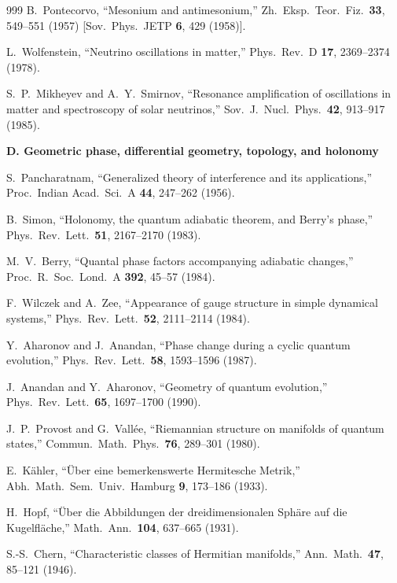 \begin{thebibliography}{999}
B.~Pontecorvo,
``Mesonium and antimesonium,''
Zh.\ Eksp.\ Teor.\ Fiz.\ \textbf{33}, 549--551 (1957)
[Sov.\ Phys.\ JETP \textbf{6}, 429 (1958)].

L.~Wolfenstein,
``Neutrino oscillations in matter,''
Phys.\ Rev.\ D \textbf{17}, 2369--2374 (1978).

S.~P.~Mikheyev and A.~Y.~Smirnov,
``Resonance amplification of oscillations in matter and spectroscopy of solar
neutrinos,'' Sov.\ J.\ Nucl.\ Phys.\ \textbf{42}, 913--917 (1985).

\item[]\textbf{D. Geometric phase, differential geometry, topology, and holonomy}

S.~Pancharatnam,
``Generalized theory of interference and its applications,''
Proc.\ Indian Acad.\ Sci.\ A \textbf{44}, 247--262 (1956).

B.~Simon,
``Holonomy, the quantum adiabatic theorem, and Berry's phase,''
Phys.\ Rev.\ Lett.\ \textbf{51}, 2167--2170 (1983).

M.~V.~Berry,
``Quantal phase factors accompanying adiabatic changes,''
Proc.\ R.\ Soc.\ Lond.\ A \textbf{392}, 45--57 (1984).

F.~Wilczek and A.~Zee,
``Appearance of gauge structure in simple dynamical systems,''
Phys.\ Rev.\ Lett.\ \textbf{52}, 2111--2114 (1984).

Y.~Aharonov and J.~Anandan,
``Phase change during a cyclic quantum evolution,''
Phys.\ Rev.\ Lett.\ \textbf{58}, 1593--1596 (1987).

J.~Anandan and Y.~Aharonov,
``Geometry of quantum evolution,''
Phys.\ Rev.\ Lett.\ \textbf{65}, 1697--1700 (1990).

J.~P.~Provost and G.~Vall\'ee,
``Riemannian structure on manifolds of quantum states,''
Commun.\ Math.\ Phys.\ \textbf{76}, 289--301 (1980).

E.~K\"ahler,
``\"Uber eine bemerkenswerte Hermitesche Metrik,''
Abh.\ Math.\ Sem.\ Univ.\ Hamburg \textbf{9}, 173--186 (1933).

H.~Hopf,
``\"Uber die Abbildungen der dreidimensionalen Sph\"are auf die Kugelfl\"ache,''
Math.\ Ann.\ \textbf{104}, 637--665 (1931).

S.-S.~Chern,
``Characteristic classes of Hermitian manifolds,''
Ann.\ Math.\ \textbf{47}, 85--121 (1946).


\end{thebibliography}

